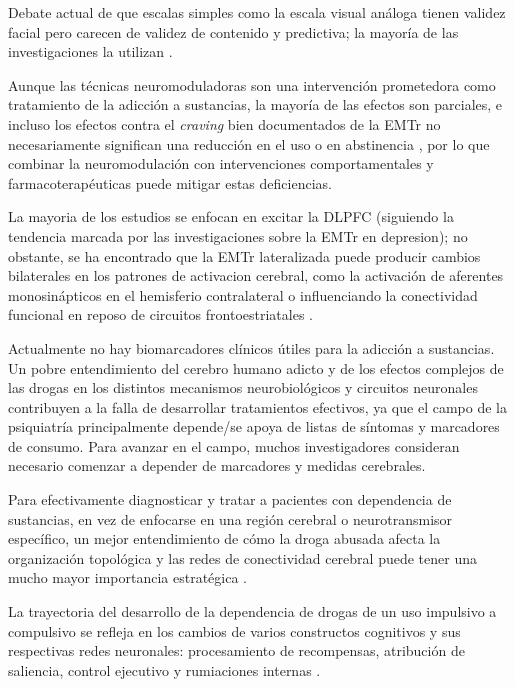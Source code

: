 Debate actual de que escalas simples como la escala visual análoga tienen validez facial pero carecen de validez de contenido y predictiva\parencite{Ekhtiari2018}; la mayoría de las investigaciones la utilizan \parencite{Barr2011}.

Aunque las técnicas neuromoduladoras son una intervención prometedora como tratamiento de la adicción a sustancias, la mayoría de las efectos son parciales, e incluso los efectos contra el \textit{craving} bien documentados de la EMTr no necesariamente significan una reducción en el uso o en abstinencia \parencite{Ekhtiari2019}, por lo que combinar la neuromodulación con intervenciones comportamentales y farmacoterapéuticas puede mitigar estas deficiencias.

La mayoria de los estudios se enfocan en excitar la DLPFC (siguiendo la tendencia marcada por las investigaciones sobre la EMTr en depresion); no obstante, se ha encontrado que la EMTr lateralizada puede producir cambios bilaterales en los patrones de activacion cerebral, como la activación de aferentes monosinápticos en el hemisferio contralateral \parencite{Hanlon2013}
o influenciando la conectividad funcional en reposo de circuitos frontoestriatales \parencite{Schluter2017}.

Actualmente no hay biomarcadores clínicos útiles para la adicción a sustancias. Un pobre entendimiento del cerebro humano adicto y de los efectos complejos de las drogas en los distintos mecanismos neurobiológicos y circuitos neuronales contribuyen a la falla de desarrollar tratamientos efectivos, ya que el campo de la psiquiatría principalmente depende/se apoya de listas de síntomas y marcadores de consumo. Para avanzar en el campo, muchos investigadores consideran necesario comenzar a depender de marcadores y medidas cerebrales.

Para efectivamente diagnosticar y tratar a pacientes con dependencia de sustancias, en vez de enfocarse en una región cerebral o neurotransmisor específico, un mejor entendimiento de cómo la droga abusada afecta la organización topológica y las redes de conectividad cerebral puede tener una mucho mayor importancia estratégica \parencite{Steele2018}.

La trayectoria del desarrollo de la dependencia de drogas de un uso impulsivo a compulsivo se refleja en los cambios de varios constructos cognitivos y sus respectivas redes neuronales: procesamiento de recompensas, atribución de saliencia, control ejecutivo y rumiaciones internas \parencite{Ekhtiari2018}.

